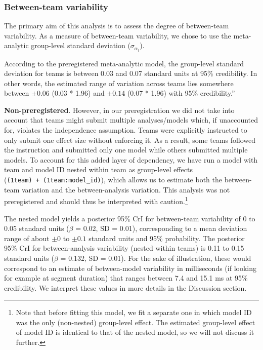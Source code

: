 \documentclass[Review,times,sageh]{sagej}
\begin{document}
\hypertarget{between-team-variability}{%
\subsubsection{Between-team variability}\label{between-team-variability}}

The primary aim of this analysis is to assess the degree of between-team variability.
As a measure of between-team variability, we chose to use the meta-analytic group-level standard deviation (\(\sigma_{\alpha_{\text{t}}}\)).

According to the preregistered meta-analytic model, the group-level standard deviation for teams is between 0.03 and 0.07 standard units at 95\% credibility.
In other words, the estimated range of variation across teams lies somewhere between \(\pm 0.06\) (0.03 * 1.96) and \(\pm 0.14\) (0.07 * 1.96) with 95\% credibility.''

\textbf{Non-preregistered}. However, in our preregistration we did not take into account that teams might submit multiple analyses/models which, if unaccounted for, violates the independence assumption.
Teams were explicitly instructed to only submit one effect size without enforcing it.
As a result, some teams followed the instruction and submitted only one model while others submitted multiple models.
To account for this added layer of dependency, we have run a model with team and model ID nested within team as group-level effects (\texttt{(1\textbar{}team)\ +\ (1\textbar{}team:model\_id)}), which allows us to estimate both the between-team variation and the between-analysis variation.
This analysis was not preregistered and should thus be interpreted with caution.\footnote{Note that before fitting this model, we fit a separate one in which model ID was the only (non-nested) group-level effect.
  The estimated group-level effect of model ID is identical to that of the nested model, so we will not discuss it further.}

The nested model yields a posterior 95\% CrI for between-team variability of 0 to 0.05 standard units (\(\beta\) = 0.02, SD = 0.01), corresponding to a mean deviation range of about \(\pm 0\) to \(\pm 0.1\) standard units and 95\% probability.
The posterior 95\% CrI for between-analysis variability (nested within teams) is 0.11 to 0.15 standard units (\(\beta\) = 0.132, SD = 0.01).
For the sake of illustration, these would correspond to an estimate of between-model variability in milliseconds (if looking for example at segment duration) that ranges between 7.4 and 15.1 ms at 95\% credibility.
We interpret these values in more details in the Discussion section.
\end{document}
